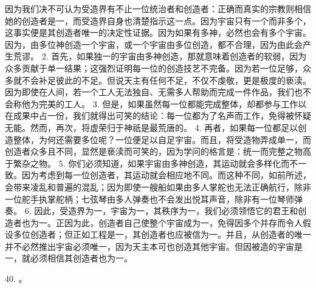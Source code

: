 因为我们决不可认为受造界有不止一位统治者和创造者：正确而真实的宗教则相信她的创造者是一，而受造界自身也清楚指示这一点。因为宇宙只有一个而非多个，这事实便是其创造者唯一的决定性证据。因为如果有多神，必然也会有多个宇宙。因为，由多位神创造一个宇宙，或一个宇宙由多位创造，都不合理，因为由此会产生荒谬。 2. 首先，如果独一的宇宙由多神创造，那就意味着创造者的软弱，因为众多贡献于单一结果；这强烈证明每一位的创造技艺不完备。因为若一位足够，众多就不会补足彼此的不足。但说天主有任何不足，不仅不虔敬，更是极度的亵渎。因为即使在人间，若一个工人无法独自、无需多人帮助而完成一件作品，我们也不会称他为完美的工人。 3. 但是，如果虽然每一位都能完成整体，却都参与工作以在成果中占一份，我们就得出可笑的结论：每一位都为了名声而工作，免得被怀疑无能。然而，再次，将虚荣归于神祇是最荒唐的。 4. 再者，如果每一位都足以创造整体，为何还需要多位呢？一位便足以自足宇宙。而且，将受造物弄成单一，而创造者众多且不同，显然是亵渎而可笑的，因为学问的格言是：统一而完整之物高于繁杂之物。 5. 你们必须知道，如果宇宙由多神创造，其运动就会多样化而不一致。因为考虑到每一位创造者，其运动就会相应地不同。而这种不同，如前所述，会带来凌乱和普遍的混乱；因为即使一艘船如果由多人掌舵也无法正确航行，除非一位舵手执掌舵柄；七弦琴由多人弹奏也不会发出悦耳声音，除非有一位琴师弹奏。 6. 因此，受造界为一，宇宙为一，其秩序为一，我们必须领悟它的君王和创造者也为一。正因为此，创造者自己使整个宇宙成为一，免得因多个并存而令人假设多位创造者；但正如工程是一，其创造者也应被信为一。并且，从创造者的唯一并不必然推出宇宙必须唯一，因为天主本可也创造其他宇宙。但因被造的宇宙是一，就必须相信其创造者也为一。\par

40. 。\par

